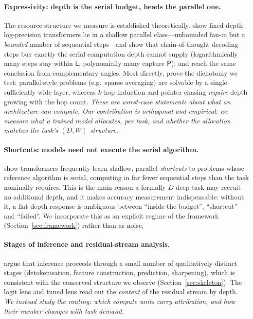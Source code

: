\documentclass[11pt]{article}
\begin{document}
\paragraph{Expressivity: depth is the serial budget, heads the parallel one.}
The resource structure we measure is established theoretically.
\citet{merrill2023parallelism} show fixed-depth log-precision transformers lie
in a shallow parallel class---unbounded fan-in but a \emph{bounded} number of
sequential steps---and \citet{merrill2024cot} show that chain-of-thought
decoding steps buy exactly the serial computation depth cannot supply
(logarithmically many steps stay within $\mathsf{L}$, polynomially many
capture $\mathsf{P}$); \citet{li2024chain} and \citet{feng2023towards} reach
the same conclusion from complementary angles. Most directly,
\citet{sanford2023representational,sanford2024transformers} prove the
dichotomy we test: parallel-style problems (e.g.\ sparse averaging) are
solvable by a single sufficiently wide layer, whereas $k$-hop induction and
pointer chasing \emph{require} depth growing with the hop count. \emph{These
are worst-case statements about what an architecture can compute. Our
contribution is orthogonal and empirical: we measure what a trained model
allocates, per task, and whether the allocation matches the task's $(D,W)$
structure.}

\paragraph{Shortcuts: models need not execute the serial algorithm.}
\citet{liu2023shortcuts} show transformers frequently learn shallow, parallel
\emph{shortcuts} to problems whose reference algorithm is serial, computing in
far fewer sequential steps than the task nominally requires. This is the main
reason a formally $D$-deep task may recruit no additional depth, and it makes
accuracy measurement indispensable: without it, a flat depth response is
ambiguous between ``inside the budget'', ``shortcut'' and ``failed''. We
incorporate this as an explicit regime of the framework
(Section~\ref{sec:framework}) rather than as noise.

\paragraph{Stages of inference and residual-stream analysis.}
\citet{lad2024remarkable} argue that inference proceeds through a small number
of qualitatively distinct stages (detokenisation, feature construction,
prediction, sharpening), which is consistent with the conserved structure we
observe (Section~\ref{sec:skeleton}). The logit lens
\citep{nostalgebraist2020logitlens} and tuned lens
\citep{belrose2023eliciting} read out the \emph{content} of the residual
stream by depth. \emph{We instead study the \emph{routing}: which compute
units carry attribution, and how their number changes with task demand.}
\end{document}
